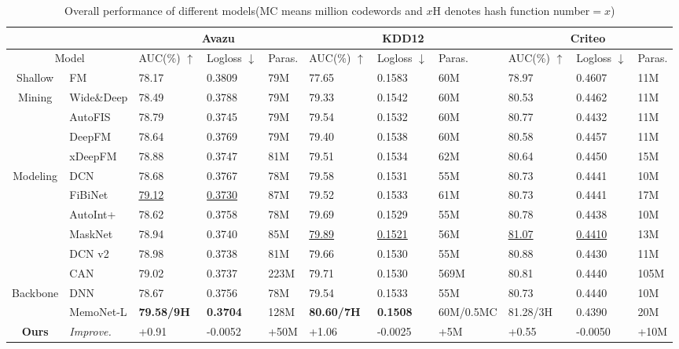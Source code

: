 \documentclass[sigconf,authorversion]{acmart}
\begin{document}
\begin{table*}
\centering
\caption{Overall performance of different models(MC means million codewords and  $x$H denotes hash function number$=x$)}
\begin{tabular}{c|l|lllllllll}
\toprule
 \multicolumn{2}{c}{} & \multicolumn{3}{c}{\textbf{Avazu}}  & \multicolumn{3}{c}{\textbf{KDD12} } & \multicolumn{3}{c}{\textbf{Criteo}} \\
\midrule
\multicolumn{2}{c}{Model} & AUC(\%) $\uparrow$ &  Logloss $\downarrow$ &Paras. & AUC(\%) $\uparrow$ & Logloss $\downarrow$ &Paras. & AUC(\%) $\uparrow$ & Logloss $\downarrow$ &Paras.   \\
\midrule
Shallow &FM       & 78.17 &0.3809 &79M  & 77.65 &0.1583 &60M & 78.97  & 0.4607 &11M \\
\midrule
Mining &Wide\&Deep      & 78.49 &0.3788 &79M  & 79.33 &0.1542 &60M & 80.53  & 0.4462 &11M   \\
   &AutoFIS       & 78.79 &0.3745 &79M  & 79.54 &0.1532 &60M & 80.77  & 0.4432 &11M   \\
\midrule
   &DeepFM       & 78.64 &0.3769 &79M  & 79.40 &0.1538 &60M & 80.58  & 0.4457 &11M   \\
 &xDeepFM       & 78.88 &0.3747 &81M  & 79.51 &0.1534 &62M & 80.64  & 0.4450 &15M   \\
 Modeling &DCN       & 78.68 &0.3767 &78M  & 79.58 &0.1531 &55M & 80.73  & 0.4441 &10M   \\
 &FiBiNet       & \underline{79.12} &\underline{0.3730} &87M  & 79.52 &0.1533 &61M & 80.73  & 0.4441 &17M   \\
  &AutoInt+       & 78.62 &0.3758 &78M  & 79.69 &0.1529 &55M & 80.78  & 0.4438 &10M   \\
  &MaskNet       & 78.94 &0.3740 &85M  & \underline{79.89} &\underline{0.1521} &56M & \underline{81.07}  & \underline{0.4410} &13M   \\
   &DCN v2       & 78.98 &0.3738 &81M  & 79.66 &0.1530 &55M & 80.88  & 0.4430 &11M   \\
    &CAN       & 79.02 &0.3737 &223M  & 79.71 &0.1530 &569M & 80.81  & 0.4440 &105M   \\
\midrule
\midrule
Backbone&DNN       & 78.67 &0.3756 &78M  & 79.54 &0.1533 &55M & 80.73  & 0.4440 &10M   \\
\midrule
&  MemoNet-L & \textbf{79.58/9H} & \textbf{0.3704} &128M  & \textbf{80.60/7H} &\textbf{0.1508} &60M/0.5MC & 81.28/3H  & 0.4390 &20M    \\
\textbf{Ours}&  \quad \emph{Improve.} & +0.91 & -0.0052 &+50M  & +1.06 &-0.0025 &+5M & +0.55  & -0.0050 &+10M    \\

\end{tabular}
\end{table*}
\end{document}
